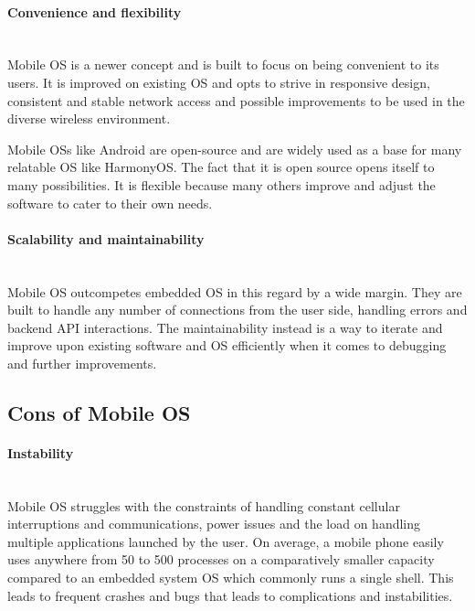 \documentclass[conference]{IEEEtran}
\newcommand{\forceindent}{\leavevmode{\parindent=1em\indent}}
\begin{document}
\medskip
\paragraph{Convenience and flexibility} \mbox{} \\
\forceindent Mobile OS is a newer concept and is built to focus on being convenient to its users. It is improved on existing OS and opts to strive in responsive design, consistent and stable network access and possible improvements to be used in the diverse wireless environment\cite{technopedia}.

\smallskip
\forceindent Mobile OSs like Android are open-source and are widely used as a base for many relatable OS like HarmonyOS. The fact that it is open source opens itself to many possibilities. It is flexible because many others improve and adjust the software to cater to their own needs.

\medskip
\paragraph{Scalability and maintainability}\mbox{} \\
\forceindent Mobile OS outcompetes embedded OS in this regard by a wide margin. They are built to handle any number of connections from the user side, handling errors and backend API interactions\cite{mediumScalability}. The maintainability instead is a way to iterate and improve upon existing software and OS efficiently when it comes to debugging and further improvements.\\

\subsection{Cons of Mobile OS}
\paragraph{Instability} \mbox{} \\
\forceindent Mobile OS struggles with the constraints of handling constant cellular interruptions and communications, power issues and the load on handling multiple applications launched by the user\cite{AAWP}. On average, a mobile phone easily uses anywhere from 50 to 500 processes on a comparatively smaller capacity compared to an embedded system OS which commonly runs a single shell. This leads to frequent crashes and bugs that leads to complications and instabilities.
\end{document}
